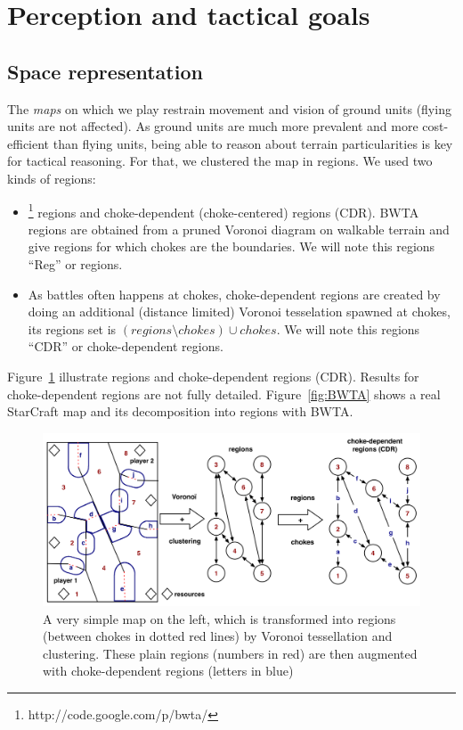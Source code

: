 \section{Perception and tactical goals}
\subsection{Space representation}
The \textit{maps} on which we play restrain movement and vision of ground units (flying units are not affected). As ground units are much more prevalent and more cost-efficient than flying units, being able to reason about terrain particularities is key for tactical reasoning. For that, we clustered the map in regions. 
We used two kinds of regions: 
\begin{itemize}
    \item {}\footnote{http://code.google.com/p/bwta/} regions and choke-dependent (choke-centered) regions (CDR). BWTA regions are obtained from a pruned Voronoi diagram on walkable terrain \citep{Perkins2010} and give regions for which chokes are the boundaries. We will note this regions ``Reg'' or regions.
    \item As battles often happens at chokes, choke-dependent regions are created by doing an additional (distance limited) Voronoi tesselation spawned at chokes, its regions set is $(regions \setminus chokes) \cup chokes$. We will note this regions ``CDR'' or choke-dependent regions.
\end{itemize}
Figure~\ref{fig:terrainanalysis} illustrate regions and choke-dependent regions (CDR). Results for choke-dependent regions are not fully detailed. Figure~\ref{fig:BWTA} shows a real StarCraft map and its decomposition into regions with BWTA.

\begin{figure}[!h]
\begin{center}
\includegraphics[width=0.99\columnwidth]{images/terrain_analysis.png}
\caption{A very simple map on the left, which is transformed into regions (between chokes in dotted red lines) by Voronoi tessellation and clustering. These plain regions (numbers in red) are then augmented with choke-dependent regions (letters in blue)}%
\label{fig:terrainanalysis}
\end{center}
\end{figure}

